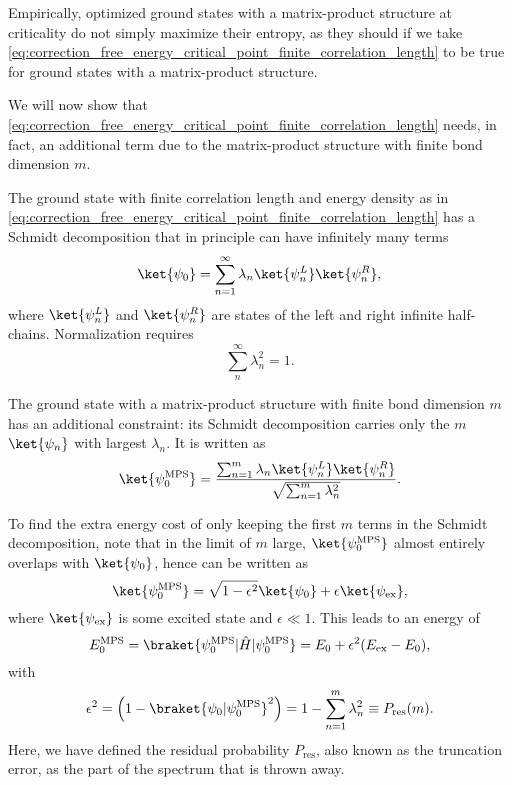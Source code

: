 Empirically, optimized ground states with a matrix-product structure at criticality do not simply maximize their
entropy, as they should if we take \autoref{eq:correction_free_energy_critical_point_finite_correlation_length} to be
true for ground states with a matrix-product structure.

We will now show that \autoref{eq:correction_free_energy_critical_point_finite_correlation_length} needs,
in fact, an additional term due to the matrix-product structure with finite bond dimension $m$.

The ground state with finite correlation length and energy density as in
\autoref{eq:correction_free_energy_critical_point_finite_correlation_length} has a Schmidt decomposition that in
principle can have infinitely many terms
\begin{equation}\label{eq:ground_state_infinite_schmidt_decomposition}
  \ket{\psi_0} = \sum_{n = 1}^{\infty} \lambda_n \ket{\psi_{n}^{L}}\ket{\psi_{n}^{R}},
\end{equation}
where $\ket{\psi_{n}^{L}}$ and $\ket{\psi_{n}^{R}}$ are states of the left and right infinite half-chains. Normalization
requires
\begin{equation}
  \sum_{n}^{\infty} \lambda_{n}^2 = 1.
\end{equation}

The ground state with a matrix-product structure with finite bond dimension $m$ has an additional constraint:
its Schmidt decomposition carries only the $m$ $\ket{\psi_n}$ with largest $\lambda_n$.
It is written as
\begin{equation}
  \ket{\psi_{0}^{\text{MPS}}} = \frac{\sum_{n = 1}^{m} \lambda_n
  \ket{\psi_{n}^{L}}\ket{\psi_{n}^{R}}}{\sqrt{\sum_{n=1}^{m} \lambda_{n}^2}}.
\end{equation}

To find the extra energy cost of only keeping the first $m$ terms in the Schmidt decomposition,
note that in the limit of $m$ large, $\ket{\psi_{0}^{\text{MPS}}}$ almost entirely overlaps with $\ket{\psi_0}$,
hence can be written as
\begin{equation}
  \ket{\psi_{0}^{\text{MPS}}} = \sqrt{1 - \epsilon^2} \ket{\psi_0} + \epsilon \ket{\psi_{\text{ex}}},
\end{equation}
where $\ket{\psi_{\text{ex}}}$ is some excited state and $\epsilon \ll 1$. This leads to an energy of
\begin{equation}
  E_{0}^{\text{MPS}} = \braket{\psi_{0}^{\text{MPS}} | \hat{H} | \psi_{0}^{\text{MPS}}} = E_0 + \epsilon^2 (E_{\text{ex}} - E_0),
\end{equation}
with
\begin{equation}
  \epsilon^2 = \left(1 - \braket{\psi_0 | \psi_{0}^{\text{MPS}}}^2 \right) = 1 - \sum_{n = 1}^{m} \lambda_{n}^2 \equiv
  P_{\text{res}}(m).
\end{equation}
Here, we have defined the residual probability $P_{\text{res}}$, also known as the truncation error,
as the part of the spectrum that is thrown away.

